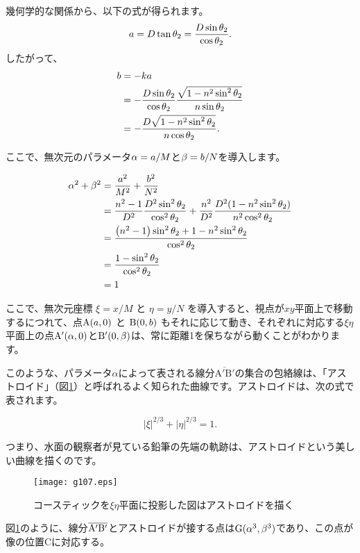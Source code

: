 \documentclass[twocolumn]{article}
\begin{document}
	幾何学的な関係から、以下の式が得られます。
	$${a} = D\tan\theta_2 = \dfrac{D\sin\theta_2}{\cos\theta_2}.$$
	したがって、
	$$\begin{aligned}
		{b} &= -k{a} \\
		&= -\dfrac{D\sin\theta_2}{\cos\theta_2}
		\dfrac{\sqrt{1-n^2\sin^2\theta_2}}{n\sin\theta_2}\\
		&=-\dfrac{D\sqrt{1-n^2\sin^2\theta_2}}{n\cos\theta_2}.
	\end{aligned}$$
	
	ここで、無次元のパラメータ${\alpha}={a}/M$と${\beta}={b}/N$を導入します。
	
	$$ \begin{aligned}
		\greeka^2 + \greekb^2 &= \dfrac{\romana^2}{M^2}+\dfrac{\romanb^2}{N^2}\\
		&=\dfrac{n^2-1}{D^2}\dfrac{D^2\sin^2\theta_2}{\cos^2\theta_2}%
		+\dfrac{n^2}{D^2}\dfrac{D^2(1-n^2\sin^2\theta_2)}{n^2\cos^2\theta_2}\\
		&=\dfrac{\left(n^2-1\right)\sin^2\theta_2 + 1-n^2\sin^2\theta_2}
		{\cos^2\theta_2}\\
		&=\dfrac{1-\sin^2\theta_2}{\cos^2\theta_2}\\
		&= 1
	\end{aligned}$$
	
	ここで、無次元座標 $\xi=x/M$ と $\eta=y/N$ を導入すると、視点が$xy$平面上で移動するにつれて、点$\mathrm{A}({a}, 0)$ と $\mathrm{B}(0, {b})$ もそれに応じて動き、それぞれに対応する$\xi\eta$平面上の点$\mathrm{A'}({\alpha}, 0)$と$\mathrm{B'}(0, {\beta})$は、常に距離1を保ちながら動くことがわかります。
	
	このような、パラメータ$\alpha$によって表される線分$\overline{\mathrm{A'B'}}$の集合の包絡線は、「アストロイド」（図\ref{fig:astroid}）と呼ばれるよく知られた曲線です。アストロイドは、次の式で表されます。
	
	$$ \left| \xi \right|^{2/3} + \left| \eta \right|^{2/3} = 1. $$
	
	つまり、水面の観察者が見ている鉛筆の先端の軌跡は、アストロイドという美しい曲線を描くのです。
	
	\begin{figure}[h]
		\centering
		\texttt{[image: g107.eps]}	
		\caption{コースティックを$\xi\eta$平面に投影した図はアストロイドを描く}
		\label{fig:astroid}
	\end{figure}
	
	図\ref{fig:astroid}のように、線分$\overline{\mathrm{{A^{\prime}}{B^{\prime}}}}$とアストロイドが接する点は$\mathrm{G}({\alpha}^3, {\beta}^3)$であり、この点が像の位置$\mathrm{C}$に対応する。
	
\end{document}
